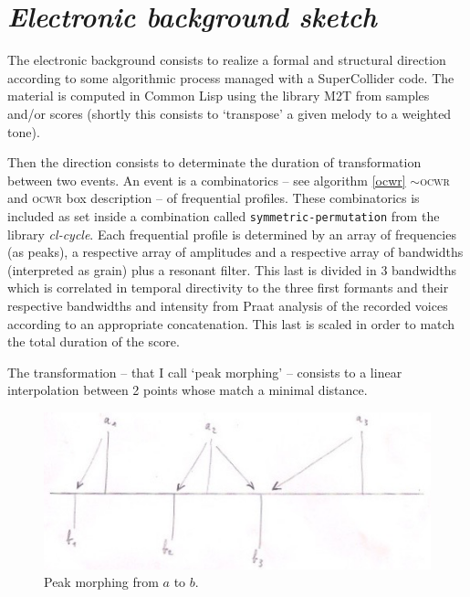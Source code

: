 \clearpage

\section{\textsl{Electronic background sketch}}

\label{imp1}

\bigskip

The electronic background consists to realize a formal and structural direction according to some algorithmic process managed with a SuperCollider code. The material is computed in Common Lisp using the library M2T from samples and/or scores (shortly this consists to `transpose' a given melody to a weighted tone).

Then the direction consists to determinate the duration of transformation between two events. An event is a combinatorics %
 -- see  algorithm \ref{ocwr} $\sim$\textsc{ocwr} and \textsc{ocwr} box description -- of frequential profiles. These combinatorics is included as set inside a combination called \texttt{symmetric-permutation} from the library \textsl{cl-cycle}. Each frequential profile is determined by an array of frequencies (as peaks), a respective array of amplitudes and a respective array of bandwidths (interpreted as grain) plus a resonant filter. This last is divided in 3 bandwidths which is correlated in temporal directivity to the three first formants and their respective bandwidths and intensity from Praat analysis of the recorded voices according to an appropriate concatenation. This last is scaled in order to match the total duration of the score.

\bigskip

The transformation --  that I call `peak morphing' -- consists to a linear interpolation between 2 points whose match a minimal distance.

\begin{figure}[h]
\begin{center}
\includegraphics[scale=0.6]{img/9873}
\caption{Peak morphing from $a$ to $b$.}
\label{a1}
\end{center}
\end{figure}

